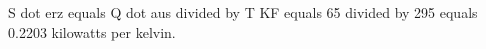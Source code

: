 S dot erz equals Q dot aus divided by T KF equals 65 divided by 295 equals 0.2203 kilowatts per kelvin.